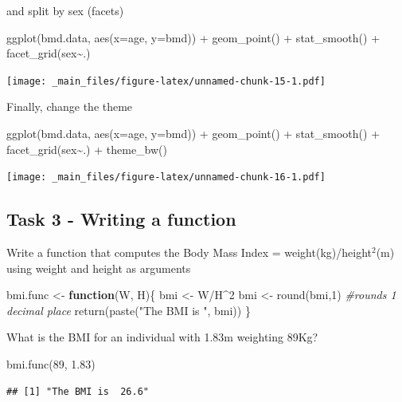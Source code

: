 \documentclass[
]{book}
\newenvironment{Shaded}{\begin{snugshade}}{\end{snugshade}}
\newcommand{\AttributeTok}[1]{\textcolor[rgb]{0.77,0.63,0.00}{#1}}
\newcommand{\CommentTok}[1]{\textcolor[rgb]{0.56,0.35,0.01}{\textit{#1}}}
\newcommand{\ControlFlowTok}[1]{\textcolor[rgb]{0.13,0.29,0.53}{\textbf{#1}}}
\newcommand{\DecValTok}[1]{\textcolor[rgb]{0.00,0.00,0.81}{#1}}
\newcommand{\FloatTok}[1]{\textcolor[rgb]{0.00,0.00,0.81}{#1}}
\newcommand{\FunctionTok}[1]{\textcolor[rgb]{0.00,0.00,0.00}{#1}}
\newcommand{\NormalTok}[1]{#1}
\newcommand{\OtherTok}[1]{\textcolor[rgb]{0.56,0.35,0.01}{#1}}
\newcommand{\SpecialCharTok}[1]{\textcolor[rgb]{0.00,0.00,0.00}{#1}}
\newcommand{\StringTok}[1]{\textcolor[rgb]{0.31,0.60,0.02}{#1}}
\begin{document}
and split by sex (facets)

\begin{Shaded}
\begin{Highlighting}[]
\FunctionTok{ggplot}\NormalTok{(bmd.data, }\FunctionTok{aes}\NormalTok{(}\AttributeTok{x=}\NormalTok{age, }\AttributeTok{y=}\NormalTok{bmd)) }\SpecialCharTok{+} 
        \FunctionTok{geom\_point}\NormalTok{() }\SpecialCharTok{+} 
        \FunctionTok{stat\_smooth}\NormalTok{() }\SpecialCharTok{+} 
        \FunctionTok{facet\_grid}\NormalTok{(sex}\SpecialCharTok{\textasciitilde{}}\NormalTok{.)}
\end{Highlighting}
\end{Shaded}

\texttt{[image: \_main\_files/figure-latex/unnamed-chunk-15-1.pdf]}

Finally, change the theme

\begin{Shaded}
\begin{Highlighting}[]
\FunctionTok{ggplot}\NormalTok{(bmd.data, }\FunctionTok{aes}\NormalTok{(}\AttributeTok{x=}\NormalTok{age, }\AttributeTok{y=}\NormalTok{bmd)) }\SpecialCharTok{+} 
        \FunctionTok{geom\_point}\NormalTok{() }\SpecialCharTok{+} 
        \FunctionTok{stat\_smooth}\NormalTok{() }\SpecialCharTok{+} 
        \FunctionTok{facet\_grid}\NormalTok{(sex}\SpecialCharTok{\textasciitilde{}}\NormalTok{.) }\SpecialCharTok{+} 
        \FunctionTok{theme\_bw}\NormalTok{()}
\end{Highlighting}
\end{Shaded}

\texttt{[image: \_main\_files/figure-latex/unnamed-chunk-16-1.pdf]}

\hypertarget{task-3---writing-a-function}{%
\subsection{Task 3 - Writing a function}\label{task-3---writing-a-function}}

Write a function that computes the Body Mass Index = weight(kg)/height\(^2\)(m)
using weight and height as arguments

\begin{Shaded}
\begin{Highlighting}[]
\NormalTok{bmi.func }\OtherTok{\textless{}{-}} \ControlFlowTok{function}\NormalTok{(W, H)\{}
\NormalTok{        bmi }\OtherTok{\textless{}{-}}\NormalTok{ W}\SpecialCharTok{/}\NormalTok{H}\SpecialCharTok{\^{}}\DecValTok{2}
\NormalTok{        bmi }\OtherTok{\textless{}{-}} \FunctionTok{round}\NormalTok{(bmi,}\DecValTok{1}\NormalTok{) }\CommentTok{\#rounds 1 decimal place }
        \FunctionTok{return}\NormalTok{(}\FunctionTok{paste}\NormalTok{(}\StringTok{"The BMI is "}\NormalTok{, bmi))}
\NormalTok{\}}
\end{Highlighting}
\end{Shaded}

What is the BMI for an individual with 1.83m weighting 89Kg?

\begin{Shaded}
\begin{Highlighting}[]
\FunctionTok{bmi.func}\NormalTok{(}\DecValTok{89}\NormalTok{, }\FloatTok{1.83}\NormalTok{)}
\end{Highlighting}
\end{Shaded}

\begin{verbatim}
## [1] "The BMI is  26.6"
\end{verbatim}
\end{document}
